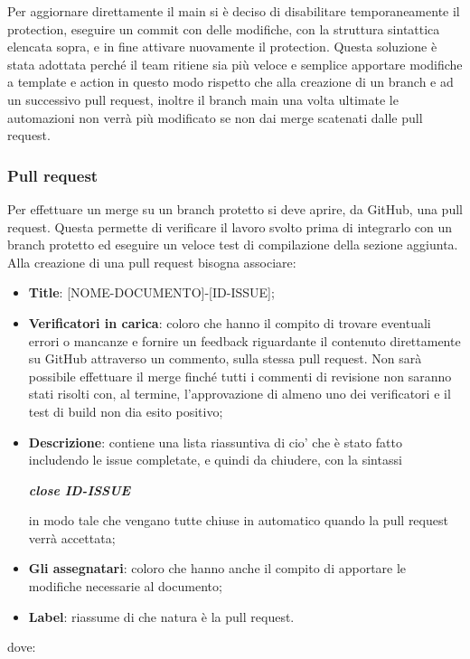         Per aggiornare direttamente il main si è deciso di disabilitare temporaneamente
        il protection, eseguire un commit con delle modifiche, con la struttura sintattica elencata sopra, e in fine attivare nuovamente il protection.
        Questa soluzione è stata adottata perché il team ritiene sia più veloce e semplice apportare modifiche a template e action in questo modo
        rispetto che alla creazione di un branch e ad un successivo pull request, inoltre il branch main una volta ultimate le automazioni non verrà più modificato se non dai merge
        scatenati dalle pull request.

        \subsubsection{Pull request}\label{inf:pr}
        Per effettuare un merge su un branch protetto si deve aprire, da GitHub, una pull request. Questa
        permette di verificare il lavoro svolto prima di integrarlo con un branch protetto ed eseguire un veloce test di compilazione della sezione aggiunta.
        Alla creazione di una pull request bisogna associare:
        \begin{itemize}
            \item \textbf{Title}: [NOME-DOCUMENTO]-[ID-ISSUE];
            \item \textbf{Verificatori in carica}: coloro che hanno il compito di trovare eventuali errori o mancanze e fornire un feedback
            riguardante il contenuto direttamente su GitHub attraverso un commento, sulla stessa pull request.
            Non sarà possibile effettuare il merge finché tutti i commenti di revisione non saranno stati risolti
            con, al termine, l'approvazione di almeno uno dei verificatori e il test di build non dia esito positivo;
            \item \textbf{Descrizione}: contiene una lista riassuntiva di cio' che è stato fatto includendo le issue completate, e quindi da chiudere,
            con la sintassi
            \begin{center}
                \textbf{\textit{close ID-ISSUE}}
            \end{center}
            in modo tale che vengano tutte chiuse in automatico quando la pull request verrà accettata;
            \item \textbf{Gli assegnatari}: coloro che hanno anche il compito di apportare le modifiche necessarie al documento;
            \item \textbf{Label}: riassume di che natura è la pull request.
        \end{itemize}
        dove:

